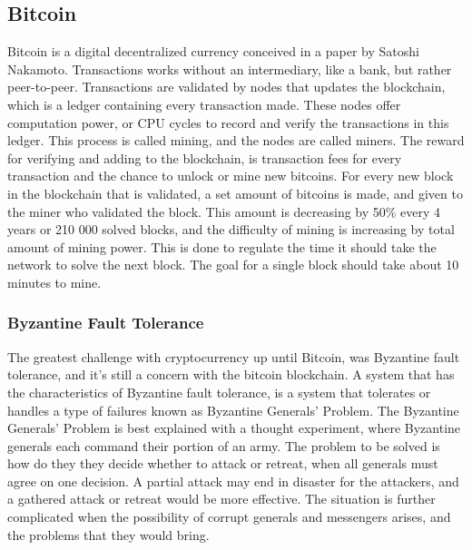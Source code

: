 \documentclass[11pt]{article}
\begin{document}
\subsection{Bitcoin}

Bitcoin is a digital decentralized currency conceived in a paper by Satoshi Nakamoto\cite{nakamoto2009bitcoin}. Transactions works without an intermediary, like a bank, but rather peer-to-peer. Transactions are validated by nodes that updates the blockchain, which is a ledger containing every transaction made. These nodes offer computation power, or CPU cycles to record and verify the transactions in this ledger. This process is called mining, and the nodes are called miners. The reward for verifying and adding to the blockchain, is transaction fees for every transaction and the chance to unlock or mine new bitcoins. For every new block in the blockchain that is validated, a set amount of bitcoins is made, and given to the miner who validated the block. This amount is decreasing by 50\% every 4 years or 210 000 solved blocks, and the difficulty of mining is increasing by total amount of mining power. This is done to regulate the time it should take the network to solve the next block. The goal for a single block should take about 10 minutes to mine.

\subsubsection{Byzantine Fault Tolerance}
The greatest challenge with cryptocurrency up until Bitcoin, was Byzantine fault tolerance, and it's still a concern with the bitcoin blockchain. A system that has the characteristics of Byzantine fault tolerance, is a system that tolerates or handles a type of failures known as Byzantine Generals' Problem\cite{lamport1982byzantine}. The Byzantine Generals' Problem is best explained with a thought experiment, where Byzantine generals each command their portion of an army. The problem to be solved is how do they they decide whether to attack or retreat, when all generals must agree on one decision. A partial attack may end in disaster for the attackers, and a gathered attack or retreat would be more effective. The situation is further complicated when the possibility of corrupt generals and messengers arises, and the problems that they would bring.
\end{document}
